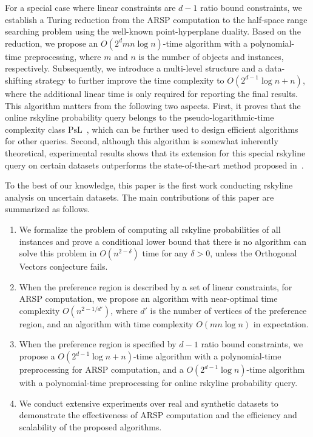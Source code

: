 For a special case where linear constraints are $d - 1$ ratio bound constraints, we establish a Turing reduction from the ARSP computation to the half-space range searching problem using the well-known point-hyperplane duality.
Based on the reduction, we propose an $O(2^dmn\log{n})$-time algorithm with a polynomial-time preprocessing, where $m$ and $n$ is the number of objects and instances, respectively.
Subsequently, we introduce a multi-level structure and a data-shifting strategy to further improve the time complexity to $O(2^{d-1}\log{n} + n)$, where the additional linear time is only required for reporting the final results.
This algorithm matters from the following two aspects.
First, it proves that the online rskyline probability query belongs to the pseudo-logarithmic-time complexity class $\mathrm{PsL}$~\cite{DBLP:journals/tcs/GaoLML20}, which can be further used to design efficient algorithms for other queries.
Second, although this algorithm is somewhat inherently theoretical, experimental results shows that its extension for this special rskyline query on certain datasets outperforms the state-of-the-art method proposed in~\cite{DBLP:conf/icde/Liu0ZP021}.

To the best of our knowledge, this paper is the first work conducting rskyline analysis on uncertain datasets.
The main contributions of this paper are summarized as follows.
\begin{enumerate}[$\bullet$]
	\item We formalize the problem of computing all rskyline probabilities of all instances and prove a conditional lower bound that there is no algorithm can solve this problem in $O(n^{2-\delta})$ time for any $\delta > 0$, unless the Orthogonal Vectors conjecture fails.
	\item When the preference region is described by a set of linear constraints, for ARSP computation, we propose an algorithm with near-optimal time complexity $O(n^{2 - 1/d'})$, where $d'$ is the number of vertices of the preference region, and an algorithm with time complexity $O(mn\log{n})$ in expectation.
	\item When the preference region is specified by $d-1$ ratio bound constraints, we propose a $O(2^{d-1}\log{n} + n)$-time algorithm with a polynomial-time preprocessing for ARSP computation, and a $O(2^{d-1}\log{n})$-time algorithm with a polynomial-time preprocessing for online rskyline probability query.
	\item We conduct extensive experiments over real and synthetic datasets to demonstrate the effectiveness of ARSP computation and the efficiency and scalability of the proposed algorithms.
\end{enumerate}

